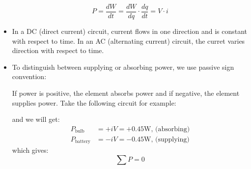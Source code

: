 \begin{itemize}
    \begin{equation}
        P = \frac{dW}{dt} = \frac{dW}{dq} \cdot \frac{dq}{dt} = V \cdot i
    \end{equation}
    \item In a DC (direct current) circuit, current flows in one direction and is constant with respect to time. In an AC (alternating current) circuit, the curret varies direction with respect to time.
    \item To distinguish between supplying or absorbing power, we use passive sign convention:
    \begin{definition}
        If power is positive, the element absorbs power and if negative, the element supplies power. Take the following circuit for example:
        \begin{center}
        \end{center}
        and we will get:
        \begin{align}
            P_\text{bulb} &= + iV = +0.45\si{\watt} ,\, \text{(absorbing)} \\ 
            P_\text{battery} &= - iV = -0.45\si{\watt} ,\, \text{(supplying)}
        \end{align}
        which gives:
        \begin{equation}
            \sum P = 0
        \end{equation}
    \end{definition}
\end{itemize}